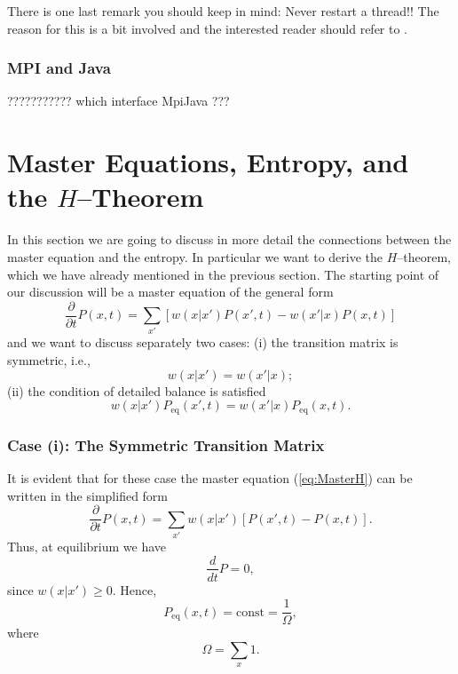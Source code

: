There is one last remark you should keep in mind: Never restart a thread!! 
The reason for this is a bit involved and the interested reader should
refer to \cite[]{JavaThreads}.

\subsubsection{MPI and Java}

??????????? which interface MpiJava ???



\section{Master Equations, Entropy, and the $H$--Theorem}
In this section we are going to discuss in more detail the connections between
the master equation and the entropy. In particular we want to derive the
$H$--theorem, which we have already mentioned in the previous section. 
The starting point of our discussion will be a master equation of the general
form
\begin{equation}
\label{eq:MasterH}
  \frac{\partial}{\partial t} P(x,t) = \sum_{x'} 
   [w(x|x') P(x',t) - w(x'|x) P(x,t)]
\end{equation}
and we want to discuss separately two cases: (i) the transition matrix is
symmetric, i.e.,
\begin{displaymath}
  w(x|x') = w(x'|x);
\end{displaymath}
(ii) the condition of detailed balance is satisfied
\begin{equation}
\label{eq:MasterDetBal}
  w(x|x') P_{\textrm{eq}}(x',t) = w(x'|x) P_{\textrm{eq}}(x,t).
\end{equation}

\subsubsection{Case (i): The Symmetric Transition Matrix}
It is evident that for these case the master equation (\ref{eq:MasterH}) can
be written in the simplified form
\begin{equation}
\label{eq:MasterHSym}
  \frac{\partial}{\partial t} P(x,t) = \sum_{x'} 
   w(x|x') [P(x',t) - P(x,t)].
\end{equation}
Thus, at equilibrium we have
\begin{displaymath}
  \frac{d}{dt}P = 0,
\end{displaymath}
since $w(x|x') \ge 0$. Hence,
\begin{equation}
\label{eq:MasterHEqSym}
  P_{\textrm{eq}} (x,t) = \textrm{const} = \frac{1}{\Omega},
\end{equation}
where 
\begin{displaymath}
  \Omega = \sum_x 1.
\end{displaymath}

